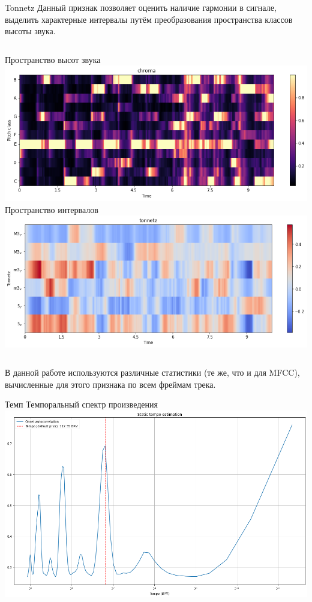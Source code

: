 \documentclass[c, aspectratio = 43]{beamer}
\begin{document}
\begin{frame}{Tonnetz}
Данный признак позволяет оценить наличие гармонии в сигнале, выделить характерные интервалы путём преобразования пространства классов высоты звука.\\
\vspace{1cm}

\begin{columns}
    Пространство высот звука
    \includegraphics[width=\linewidth]{chroma.png}
    Пространство интервалов
    \includegraphics[width=\linewidth]{tonnetz.png}
\end{columns}
\vspace{1cm}
В данной работе используются различные статистики (те же, что и для MFCC), вычисленные для этого признака по всем фреймам трека.
\end{frame}

\begin{frame}{Темп}
Темпоральный спектр произведения\\
\vspace{1cm}
\includegraphics[width=\linewidth]{tempo.png}
\end{frame}
\end{document}
